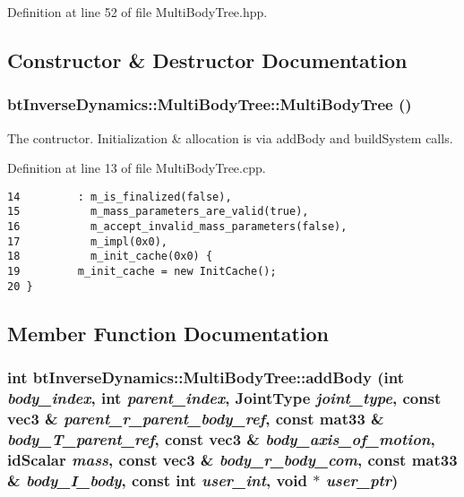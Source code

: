 Definition at line 52 of file MultiBodyTree.hpp.

\subsection{Constructor \& Destructor Documentation}
\hypertarget{classbt_inverse_dynamics_1_1_multi_body_tree_75c5f172165331d0c64f7fc02301b12a}{
\subsubsection[MultiBodyTree]{\setlength{\rightskip}{0pt plus 5cm}btInverseDynamics::MultiBodyTree::MultiBodyTree ()}}
\label{classbt_inverse_dynamics_1_1_multi_body_tree_75c5f172165331d0c64f7fc02301b12a}


The contructor. Initialization \& allocation is via addBody and buildSystem calls. 

Definition at line 13 of file MultiBodyTree.cpp.

\begin{Code}\begin{verbatim}14         : m_is_finalized(false),
15           m_mass_parameters_are_valid(true),
16           m_accept_invalid_mass_parameters(false),
17           m_impl(0x0),
18           m_init_cache(0x0) {
19         m_init_cache = new InitCache();
20 }
\end{verbatim}
\end{Code}




\subsection{Member Function Documentation}
\hypertarget{classbt_inverse_dynamics_1_1_multi_body_tree_d1f6d18e60ec7be3ec03b5aa9b8875b6}{
\subsubsection[addBody]{\setlength{\rightskip}{0pt plus 5cm}int btInverseDynamics::MultiBodyTree::addBody (int {\em body\_\-index}, \/  int {\em parent\_\-index}, \/  JointType {\em joint\_\-type}, \/  const {\bf vec3} \& {\em parent\_\-r\_\-parent\_\-body\_\-ref}, \/  const mat33 \& {\em body\_\-T\_\-parent\_\-ref}, \/  const {\bf vec3} \& {\em body\_\-axis\_\-of\_\-motion}, \/  idScalar {\em mass}, \/  const {\bf vec3} \& {\em body\_\-r\_\-body\_\-com}, \/  const mat33 \& {\em body\_\-I\_\-body}, \/  const int {\em user\_\-int}, \/  void $\ast$ {\em user\_\-ptr})}}
\label{classbt_inverse_dynamics_1_1_multi_body_tree_d1f6d18e60ec7be3ec03b5aa9b8875b6}


